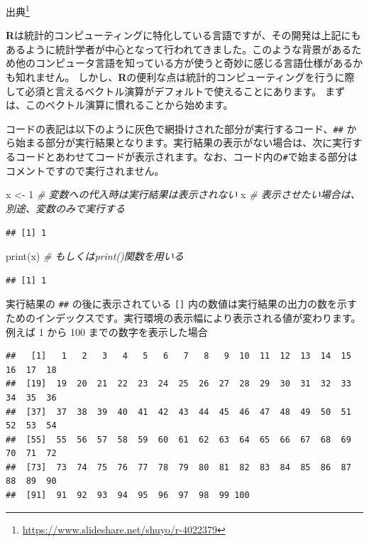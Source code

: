 \documentclass[
  12pt,
]{book}
\newenvironment{Shaded}{\begin{snugshade}}{\end{snugshade}}
\newcommand{\CommentTok}[1]{\textcolor[rgb]{0.56,0.35,0.01}{\textit{#1}}}
\newcommand{\DecValTok}[1]{\textcolor[rgb]{0.00,0.00,0.81}{#1}}
\newcommand{\FunctionTok}[1]{\textcolor[rgb]{0.00,0.00,0.00}{#1}}
\newcommand{\NormalTok}[1]{#1}
\newcommand{\OtherTok}[1]{\textcolor[rgb]{0.56,0.35,0.01}{#1}}
\DeclareRobustCommand{\href}[2]{#2\footnote{\url{#1}}}
\begin{document}
\href{https://www.slideshare.net/shuyo/r-4022379}{出典}

\textbf{R}は統計的コンピューティングに特化している言語ですが、その開発は上記にもあるように統計学者が中心となって行われてきました。このような背景があるため他のコンピュータ言語を知っている方が使うと奇妙に感じる言語仕様があるかも知れません。 しかし、\textbf{R}の便利な点は統計的コンピューティングを行うに際して必須と言えるベクトル演算がデフォルトで使えることにあります。 まずは、このベクトル演算に慣れることから始めます。

コードの表記は以下のように灰色で網掛けされた部分が実行するコード、\texttt{\#\#} から始まる部分が実行結果となります。実行結果の表示がない場合は、次に実行するコードとあわせてコードが表示されます。なお、コード内の\texttt{\#}で始まる部分はコメントですので実行されません。

\begin{Shaded}
\begin{Highlighting}[numbers=left,,]
\NormalTok{x }\OtherTok{\textless{}{-}} \DecValTok{1}        \CommentTok{\# 変数への代入時は実行結果は表示されない}
\NormalTok{x             }\CommentTok{\# 表示させたい場合は、別途、変数のみで実行する}
\end{Highlighting}
\end{Shaded}

\begin{verbatim}
## [1] 1
\end{verbatim}

\begin{Shaded}
\begin{Highlighting}[numbers=left,,]
\FunctionTok{print}\NormalTok{(x)      }\CommentTok{\# もしくはprint()関数を用いる}
\end{Highlighting}
\end{Shaded}

\begin{verbatim}
## [1] 1
\end{verbatim}

実行結果の \texttt{\#\#} の後に表示されている \texttt{{[}{]}} 内の数値は実行結果の出力の数を示すためのインデックスです。実行環境の表示幅により表示される値が変わります。例えば 1 から 100 までの数字を表示した場合

\begin{verbatim}
##   [1]   1   2   3   4   5   6   7   8   9  10  11  12  13  14  15  16  17  18
##  [19]  19  20  21  22  23  24  25  26  27  28  29  30  31  32  33  34  35  36
##  [37]  37  38  39  40  41  42  43  44  45  46  47  48  49  50  51  52  53  54
##  [55]  55  56  57  58  59  60  61  62  63  64  65  66  67  68  69  70  71  72
##  [73]  73  74  75  76  77  78  79  80  81  82  83  84  85  86  87  88  89  90
##  [91]  91  92  93  94  95  96  97  98  99 100
\end{verbatim}
\end{document}
